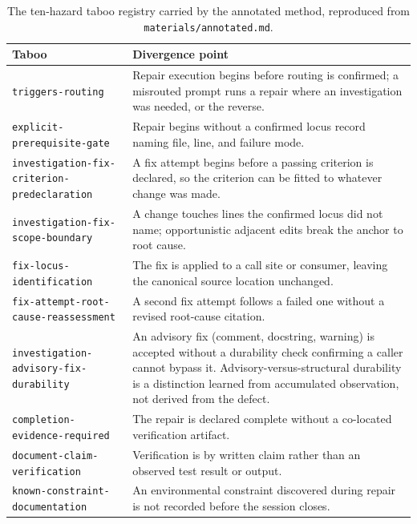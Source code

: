 \documentclass[11pt,a4paper]{article}
\begin{document}
\begin{table}[h]
\centering
\scriptsize
\begin{tabular}{p{4cm} p{10.5cm}}
\toprule
\textbf{Taboo} & \textbf{Divergence point} \\
\midrule
\texttt{triggers-routing} & Repair execution begins before routing is confirmed; a misrouted prompt runs a repair where an investigation was needed, or the reverse. \\
\texttt{explicit-prerequisite-gate} & Repair begins without a confirmed locus record naming file, line, and failure mode. \\
\texttt{investigation-fix-criterion-predeclaration} & A fix attempt begins before a passing criterion is declared, so the criterion can be fitted to whatever change was made. \\
\texttt{investigation-fix-scope-boundary} & A change touches lines the confirmed locus did not name; opportunistic adjacent edits break the anchor to root cause. \\
\texttt{fix-locus-identification} & The fix is applied to a call site or consumer, leaving the canonical source location unchanged. \\
\texttt{fix-attempt-root-cause-reassessment} & A second fix attempt follows a failed one without a revised root-cause citation. \\
\texttt{investigation-advisory-fix-durability} & An advisory fix (comment, docstring, warning) is accepted without a durability check confirming a caller cannot bypass it. Advisory-versus-structural durability is a distinction learned from accumulated observation, not derived from the defect. \\
\texttt{completion-evidence-required} & The repair is declared complete without a co-located verification artifact. \\
\texttt{document-claim-verification} & Verification is by written claim rather than an observed test result or output. \\
\texttt{known-constraint-documentation} & An environmental constraint discovered during repair is not recorded before the session closes. \\
\bottomrule
\end{tabular}
\caption{The ten-hazard taboo registry carried by the annotated method,
reproduced from \texttt{materials/annotated.md}.}
\label{tab:registry}
\end{table}
\end{document}
